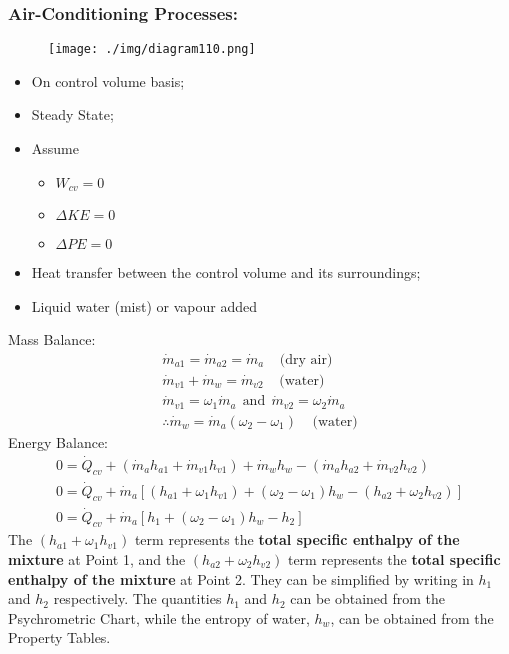 \subsubsection{Air-Conditioning Processes:}
\begin{figure}[H]
  \centering
  \texttt{[image: ./img/diagram110.png]}
  \caption{}
\end{figure}
\begin{itemize}[noitemsep]
  \item On control volume basis;
  \item Steady State;
  \item Assume
        \begin{itemize}[noitemsep]
          \item $W_{cv} = 0$
          \item $\Delta KE = 0$
          \item $\Delta PE = 0$
        \end{itemize}
  \item Heat transfer between the control volume and its surroundings;
  \item Liquid water (mist) or vapour added
\end{itemize}
Mass Balance:
\begin{gather}
  \dot{m}_{a1} = \dot{m}_{a2} = \dot{m}_{a} \ \ \ \ \ \text{(dry air)} \\[5pt]
  \dot{m}_{v1} + \dot{m}_{w} = \dot{m}_{v2} \ \ \ \ \ \text{(water)} \\[5pt]
  \dot{m}_{v1} = \omega_1\dot{m}_{a} \ \ \text{and} \ \ \dot{m}_{v2} = \omega_2\dot{m}_{a} \\[5pt]
  \therefore \dot{m}_{w} = \dot{m}_{a}(\omega_2 - \omega_1) \ \ \ \ \ \text{(water)}
\end{gather}
Energy Balance:
\begin{gather}
  0 = \dot{Q}_{cv} + (\dot{m}_{a}h_{a1} + \dot{m}_{v1}h_{v1}) + \dot{m}_{w}h_{w} - (\dot{m}_{a}h_{a2} + \dot{m}_{v2}h_{v2}) \\[5pt]
  0 = \dot{Q}_{cv} + \dot{m}_{a}\left[(h_{a1} + \omega_1h_{v1}) + (\omega_2-\omega_1)h_{w} - (h_{a2} + \omega_2h_{v2})\right] \\[5pt]
  0 = \dot{Q}_{cv} + \dot{m}_{a}[h_1 + (\omega_2-\omega_1)h_{w} - h_2]
\end{gather}
The $(h_{a1} + \omega_1h_{v1})$ term represents the \textbf{total specific enthalpy of the mixture} at Point 1, and the $(h_{a2} + \omega_2h_{v2})$ term represents the \textbf{total specific enthalpy of the mixture} at Point 2. They can be simplified by writing in $h_1$ and $h_2$ respectively. The quantities $h_1$ and $h_2$ can be obtained from the Psychrometric Chart, while the entropy of water, $h_w$, can be obtained from the Property Tables. \\\\
